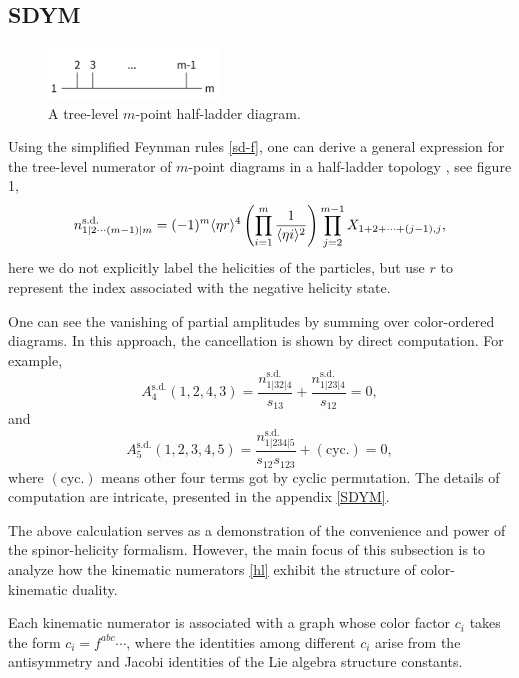 \documentclass[a4paper,11pt]{article}
\begin{document}
\subsection{SDYM}
\begin{figure}[h]
    \centering
    \includegraphics[width=0.4\textwidth]{hl.png}
    \caption{A tree-level $m$-point half-ladder diagram.}
\end{figure}
Using the simplified Feynman rules \eqref{sd-f}, one can derive a general expression for the tree-level numerator of $m$-point diagrams in a half-ladder topology \cite{He:2015wgf}, see figure 1,
\begin{equation}\label{hl}
    n^{\text{s.d.}}_{1|2\cdots (m-1)|m}=(-1)^m\langle \eta r \rangle^4\left(\prod_{i=1}^m\frac{1}{\langle\eta i\rangle^2}\right)\prod_{j=2}^{m-1}X_{1+2+\cdots+(j-1),j},
\end{equation}
here we do not explicitly label the helicities of the particles, but use $r$ to represent the index associated with the negative helicity state.\par
One can see the vanishing of partial amplitudes by summing over color-ordered diagrams. In this approach, the cancellation is shown by direct computation.
For example,
\begin{equation}
    A^{\text{s.d.}}_4(1,2,4,3)=\frac{n^{\text{s.d.}}_{1|32|4}}{s_{13}}+\frac{n^{\text{s.d.}}_{1|23|4}}{s_{12}}=0,
\end{equation}
and
\begin{equation}
    A^{\text{s.d.}}_5(1,2,3,4,5)=\frac{n^{\text{s.d.}}_{1|234|5}}{s_{12} s_{123}}+(\text{cyc.})=0,
\end{equation}
where $(\text{cyc.})$ means other four terms got by cyclic permutation.
The details of computation are intricate, presented in the appendix \ref{SDYM}.\par
The above calculation serves as a demonstration of the convenience and power of the spinor-helicity formalism. 
However, the main focus of this subsection is to analyze how the kinematic numerators \eqref{hl} exhibit the structure of color-kinematic duality. \par 
Each kinematic numerator is associated with a graph whose color factor $c_i$ takes the form $c_i=f^{abc}\cdots$, 
where the identities among different $c_i$ arise from the antisymmetry and Jacobi identities of the Lie algebra structure constants. 
\end{document}
